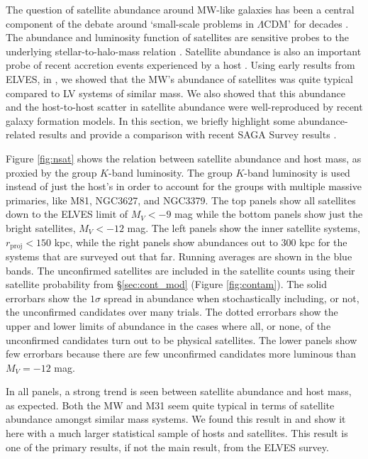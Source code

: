 \documentclass[twocolumn]{aastex62}
\begin{document}
The question of satellite abundance around MW-like galaxies has been a central component of the debate around `small-scale problems in $\Lambda$CDM' for decades \citep[e.g.][]{moore1999, klypin1999, bullock2017}. The abundance and luminosity function of satellites are sensitive probes to the underlying stellar-to-halo-mass relation \citep[SHMR; e.g.][]{gk_2017, nadler2020}. Satellite abundance is also an important probe of recent accretion events experienced by a host \citep{smercina2021}.  Using early results from ELVES, in \citet{carlsten2020b}, we showed that the MW's abundance of satellites was quite typical compared to LV systems of similar mass. We also showed that this abundance and the host-to-host scatter in satellite abundance were well-reproduced by recent galaxy formation models. In this section, we briefly highlight some abundance-related results and provide a comparison with recent SAGA Survey results \citep{mao2020}. 


Figure \ref{fig:nsat} shows the relation between satellite abundance and host mass, as proxied by the group $K$-band luminosity. The group $K$-band luminosity is used instead of just the host's in order to account for the groups with multiple massive primaries, like M81, NGC3627, and NGC3379. The top panels show all satellites down to the ELVES limit of $M_V<-9$ mag while the bottom panels show just the bright satellites, $M_V<-12$ mag. The left panels show the inner satellite systems, $r_\mathrm{proj}<150$ kpc, while the right panels show abundances out to $300$ kpc for the systems that are surveyed out that far. Running averages are shown in the blue bands. The unconfirmed satellites are included in the satellite counts using their satellite probability from \S\ref{sec:cont_mod} (Figure \ref{fig:contam}). The solid errorbars show the $1\sigma$ spread in abundance when stochastically including, or not, the unconfirmed candidates over many trials. The dotted errorbars show the upper and lower limits of abundance in the cases where all, or none, of the unconfirmed candidates turn out to be physical satellites. The lower panels show few errorbars because there are few unconfirmed candidates more luminous than $M_V=-12$ mag.


In all panels, a strong trend is seen between satellite abundance and host mass, as expected. Both the MW and M31 seem quite typical in terms of satellite abundance amongst similar mass systems. We found this result in \citet{carlsten2020b} and show it here with a much larger statistical sample of hosts and satellites. This result is one of the primary results, if not the main result, from the ELVES survey.
\end{document}
